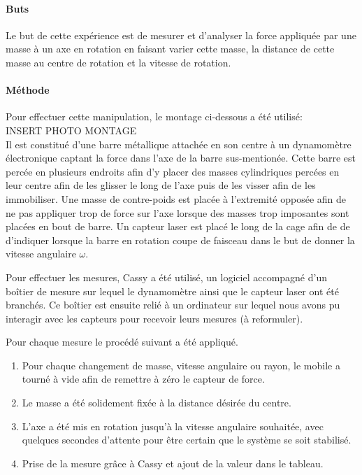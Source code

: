 \paragraph{Buts}
Le but de cette expérience est de mesurer et d'analyser la force appliquée par une masse à un axe en rotation en faisant varier cette masse, la distance de cette masse au centre de rotation et la vitesse de rotation.
\paragraph{Méthode}
Pour effectuer cette manipulation, le montage ci-dessous a été utilisé:\\
INSERT PHOTO MONTAGE\\
Il est constitué d'une barre métallique attachée en son centre à un dynamomètre électronique captant la force dans l'axe de la barre sus-mentionée.
Cette barre est percée en plusieurs endroits afin d'y placer des masses cylindriques percées en leur centre afin de les glisser le long de l'axe puis de les visser afin de les immobiliser.
Une masse de contre-poids est placée à l'extremité opposée afin de ne pas appliquer trop de force sur l'axe lorsque des masses trop imposantes sont placées en bout de barre.
Un capteur laser est placé le long de la cage afin de de d'indiquer lorsque la barre en rotation coupe de faisceau dans le but de donner la vitesse angulaire $\omega$.

Pour effectuer les mesures, Cassy a été utilisé, un logiciel accompagné d'un boîtier de mesure sur lequel le dynamomètre ainsi que le capteur laser ont été branchés.
Ce boîtier est ensuite relié à un ordinateur sur lequel nous avons pu interagir avec les capteurs pour recevoir leurs mesures (à reformuler).

Pour chaque mesure le procédé suivant a été appliqué.
\begin{enumerate}
    \item Pour chaque changement de masse, vitesse angulaire ou rayon, le mobile a tourné à vide afin de remettre à zéro le capteur de force.
    \item Le masse a été solidement fixée à la distance désirée du centre.
    \item L'axe a été mis en rotation jusqu'à la vitesse angulaire souhaitée, avec quelques secondes d'attente pour être certain que le système se soit stabilisé.
    \item Prise de la mesure grâce à Cassy et ajout de la valeur dans le tableau.
\end{enumerate}

